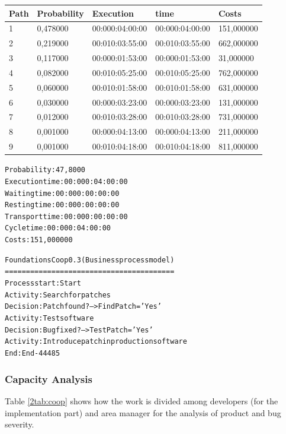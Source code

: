 \begin{table}[ht!]
\centering
\begin{tabular}{|l|l|l|l|l|}
\hline
Path&Probability&Execution&time&Costs\\
\hline
1&0,478000&00:000:04:00:00&00:000:04:00:00&151,000000\\
\hline
2&0,219000&00:010:03:55:00&00:010:03:55:00&662,000000\\
\hline
3&0,117000&00:000:01:53:00&00:000:01:53:00&31,000000\\
\hline
4&0,082000&00:010:05:25:00&00:010:05:25:00&762,000000\\
\hline
5&0,060000&00:010:01:58:00&00:010:01:58:00&631,000000\\
\hline
6&0,030000&00:000:03:23:00&00:000:03:23:00&131,000000\\
\hline
7&0,012000&00:010:03:28:00&00:010:03:28:00&731,000000\\
\hline
8&0,001000&00:000:04:13:00&00:000:04:13:00&211,000000\\
\hline
9&0,001000&00:010:04:18:00&00:010:04:18:00&811,000000\\
\hline
\end{tabular}
\end{table}

\begin{alltt}
Probability:   47,8000%
Execution time:  00:000:04:00:00
Waiting time:  00:000:00:00:00
Resting time:  00:000:00:00:00
Transport time:  00:000:00:00:00
Cycle time:  00:000:04:00:00
Costs:  151,000000

Foundations Coop 0.3 (Business process model)
========================================
Process start: Start
Activity: Search for patches
Decision: Patch found? --> FindPatch = 'Yes'
Activity: Test software
Decision: Bug fixed? --> TestPatch = 'Yes'
Activity: Introduce patch in production software
End: End-44485
\end{alltt}

\subsubsection{Capacity Analysis}
Table \ref{2tab:coop} shows how the work is divided among developers (for
the implementation part) and area manager for the analysis of product and
bug severity. 

